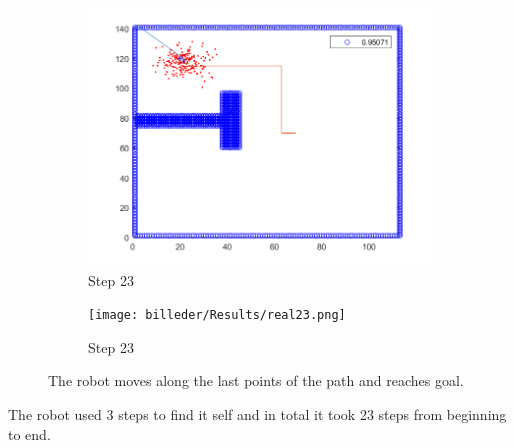 \begin{figure}[H]
\begin{subfigure}{.5\textwidth}
  \centering
  \includegraphics[width=.8\linewidth]{billeder/Results/23.png}
  \caption{Step 23}
  \label{ResultDriveFig3:sub5}
\end{subfigure}%
\begin{subfigure}{.5\textwidth}
  \centering
  \texttt{[image: billeder/Results/real23.png]}
  \caption{Step 23}
  \label{ResultDriveFig3:sub6}
\end{subfigure}
\caption{The robot moves along the last points of the path and reaches goal.}
\label{ResultDriveFig3}
\end{figure}

The robot used 3 steps to find it self and in total it took 23 steps from beginning to end. 

